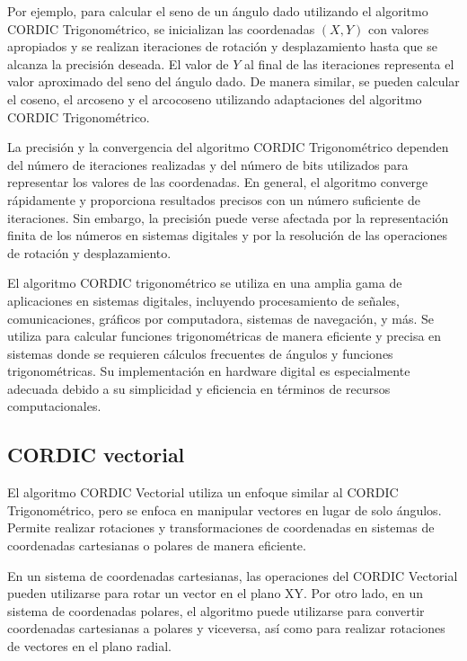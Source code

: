 \documentclass[12pt,a4paper, twoside]{article} %
\begin{document}
Por ejemplo, para calcular el seno de un ángulo dado utilizando el algoritmo CORDIC Trigonométrico, se inicializan las coordenadas $(X, Y)$ con valores apropiados y se realizan iteraciones de rotación y desplazamiento hasta que se alcanza la precisión deseada. El valor de $Y$ al final de las iteraciones representa el valor aproximado del seno del ángulo dado. De manera similar, se pueden calcular el coseno, el arcoseno y el arcocoseno utilizando adaptaciones del algoritmo CORDIC Trigonométrico.


La precisión y la convergencia del algoritmo CORDIC Trigonométrico dependen del número de iteraciones realizadas y del número de bits utilizados para representar los valores de las coordenadas. En general, el algoritmo converge rápidamente y proporciona resultados precisos con un número suficiente de iteraciones. Sin embargo, la precisión puede verse afectada por la representación finita de los números en sistemas digitales y por la resolución de las operaciones de rotación y desplazamiento.


El algoritmo CORDIC trigonométrico se utiliza en una amplia gama de aplicaciones en sistemas digitales, incluyendo procesamiento de señales, comunicaciones, gráficos por computadora, sistemas de navegación, y más. Se utiliza para calcular funciones trigonométricas de manera eficiente y precisa en sistemas donde se requieren cálculos frecuentes de ángulos y funciones trigonométricas. Su implementación en hardware digital es especialmente adecuada debido a su simplicidad y eficiencia en términos de recursos computacionales.



\subsection{CORDIC vectorial}
\label{sec:orgdaca22c}


El algoritmo CORDIC Vectorial utiliza un enfoque similar al CORDIC Trigonométrico, pero se enfoca en manipular vectores en lugar de solo ángulos. Permite realizar rotaciones y transformaciones de coordenadas en sistemas de coordenadas cartesianas o polares de manera eficiente. 

En un sistema de coordenadas cartesianas, las operaciones del CORDIC Vectorial pueden utilizarse para rotar un vector en el plano XY. Por otro lado, en un sistema de coordenadas polares, el algoritmo puede utilizarse para convertir coordenadas cartesianas a polares y viceversa, así como para realizar rotaciones de vectores en el plano radial.
\end{document}

